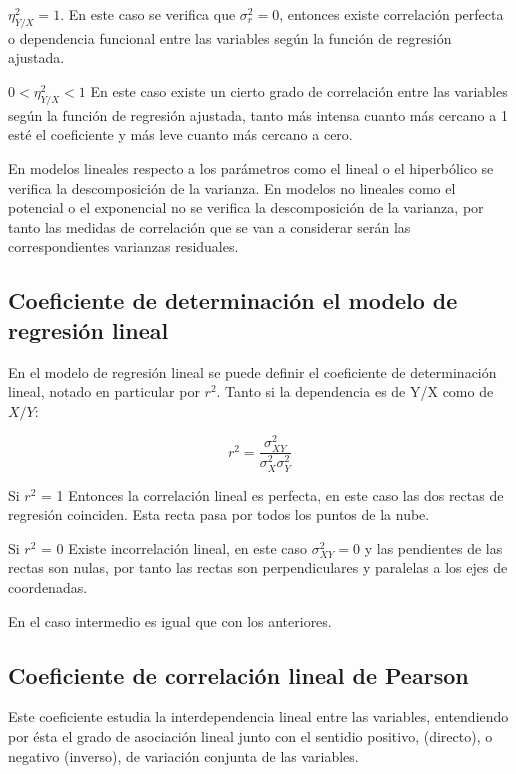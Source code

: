 \documentclass{article}
\theoremstyle{definition}
\begin{document}
\vspace{2mm}

	$ \eta_{Y/X}^2 = 1 $. En este caso se verifica que $\sigma_r^2 = 0$, entonces
	existe correlación perfecta o dependencia funcional entre las variables según
	la función de regresión ajustada.

\vspace{2mm}

	$ 0 < \eta_{Y/X}^2 < 1 $  En este caso existe un cierto grado de correlación
	entre las variables según la función de regresión ajustada, tanto más intensa
	cuanto más cercano a 1 esté el coeficiente y más leve cuanto más cercano a
	cero.

En modelos lineales respecto a los parámetros como el lineal o el hiperbólico se
verifica la descomposición de la varianza. En modelos no lineales como el
potencial o el exponencial no se verifica la descomposición de la varianza, por
tanto las medidas de correlación que se van a considerar serán las
correspondientes varianzas residuales.

\subsection{Coeficiente de determinación el modelo de regresión lineal}

En el modelo de regresión lineal se puede definir el coeficiente de
determinación lineal, notado en particular por $r^2$. Tanto si la dependencia es
de Y/X como de $X/Y$:

$$ r^2 = \frac{\sigma_{XY}^2}{ \sigma_{X}^2 \sigma_{Y}^2 } $$

Si $r^2$ = 1 Entonces la correlación lineal es perfecta, en este caso las dos
rectas de regresión coinciden. Esta recta pasa por todos los puntos de la nube.

Si $r^2$ = 0 Existe incorrelación lineal, en este caso $\sigma_{XY}^2 = 0$ y las
pendientes de las rectas son nulas, por tanto las rectas son perpendiculares y
paralelas a los ejes de coordenadas.

En el caso intermedio es igual que con los anteriores.

\subsection{Coeficiente de correlación lineal de Pearson}

Este coeficiente estudia la interdependencia lineal entre las variables,
entendiendo por ésta el grado de asociación lineal junto con el sentidio
positivo, (directo), o negativo (inverso), de variación conjunta de las
variables.
\end{document}
